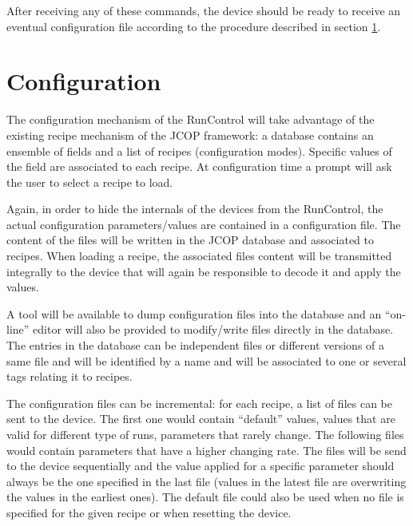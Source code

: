 \documentclass[a4paper]{article}
\begin{document}
After receiving any of these commands, the device should be ready to receive an eventual
configuration file according to the procedure described in section \ref{sec:configuration}.

\section{Configuration}\label{sec:configuration}
The configuration mechanism of the RunControl will take advantage of the existing recipe mechanism
of the JCOP\cite{biblio:JCOP} framework: a database contains an ensemble of fields and a list of
recipes (configuration modes). Specific values of the field are associated to each recipe. At
configuration time a prompt will ask the user to select a recipe to load.

Again, in order to hide the internals of the devices from the RunControl, the actual configuration
parameters/values are contained in a configuration file. The content of the files will be written in
the JCOP database and associated to recipes. When loading a recipe, the associated files content
will be transmitted integrally to the device that will again be responsible to decode it and apply
the values.

A tool will be available to dump configuration files into the database and an ``on-line'' editor will
also be provided to modify/write files directly in the database. The entries in the database can be
independent files or different versions of a same file and will be identified by a name and will
be associated to one or several tags relating it to recipes.

The configuration files can be incremental: for each recipe, a list of files can be sent to the
device. The first one would contain ``default'' values, values that are valid for different type of
runs, parameters that rarely change. The following files would contain parameters that have a
higher changing rate. The files will be send to the device sequentially and the value applied for a
specific parameter should always be the one specified in the last file (values in the latest file
are overwriting the values in the earliest ones). The default file could also be used when no file
is specified for the given recipe or when resetting the device.
\end{document}
